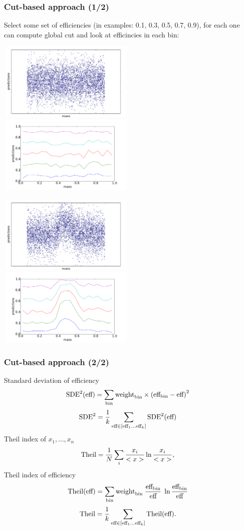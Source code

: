 \documentclass{beamer}
\begin{document}
\begin{frame}
    \frametitle{Cut-based approach (1/2)}
    Select some set of efficiencies (in examples: 0.1, 0.3, 0.5, 0.7, 0.9), 
    for each one can compute global cut and look at efficincies in each bin:

    \includegraphics[width=0.5\textwidth, height=3.8cm]{img/uniform.pdf}
    \includegraphics[width=0.5\textwidth, height=3.8cm]{img/uniform_effs.pdf}

    \includegraphics[width=0.5\textwidth, height=3.8cm]{img/nonuniform.pdf}
    \includegraphics[width=0.5\textwidth, height=3.8cm]{img/nonuniform_effs.pdf}

\end{frame}

\begin{frame}
    \frametitle{Cut-based approach (2/2)}
    Standard deviation of efficiency
    \[
	\text{SDE}^2(\text{eff}) = 
		\sum_{\text{bin}} \text{weight}_\text{bin} \times \left(\text{eff}_\text{bin} - \text{eff} \right)^2 
	\]
	\[
	\text{SDE}^2  =  \frac{1}{k} 
	\sum_{\text{eff} \in [\text{eff}_1 \dots \text{eff}_k] }  
		\text{SDE}^2(\text{eff})
	\] 
	Theil index of $x_1, \dots, x_n$
	\[
		\text{Theil} = \frac{1}{N} \sum_i \frac{x_i}{<x>} \ln{\frac{x_i}{<x>}}, 
	\]
    Theil index of efficiency
	\[
	\text{Theil}(\text{eff}) = \sum_{\text{bin}} \text{weight}_\text{bin} \; \frac{\text{eff}_\text{bin}}{\text{eff}} \; \ln{\frac{\text{eff}_\text{bin}}{\text{eff}}}
	\]
    \[
    \text{Theil}  =  \frac{1}{k} 
    \sum_{\text{eff} \in [\text{eff}_1 \dots \text{eff}_k] }  
        \text{Theil}(\text{eff}).
    \]
\end{frame}
\end{document}
